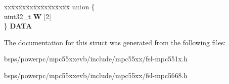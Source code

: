 \begin{DoxyCompactItemize}
\begin{tabbing}
\end{tabbing}\item 
\mbox{\label{structFLEXCAN__tag_1_1canbuf__t_a70ef9ec0f7e2e9c85c2853020dc46f9b}} 
\begin{tabbing}
xx\=xx\=xx\=xx\=xx\=xx\=xx\=xx\=xx\=\kill
union \{\\
\>uint32\_t {\bfseries W} \mbox{[}2\mbox{]}\\
\} {\bfseries DATA}\\

\end{tabbing}\end{DoxyCompactItemize}


The documentation for this struct was generated from the following files\+:\begin{DoxyCompactItemize}
\item 
bsps/powerpc/mpc55xxevb/include/mpc55xx/fsl-\/mpc551x.\+h\item 
bsps/powerpc/mpc55xxevb/include/mpc55xx/fsl-\/mpc5668.\+h\end{DoxyCompactItemize}
